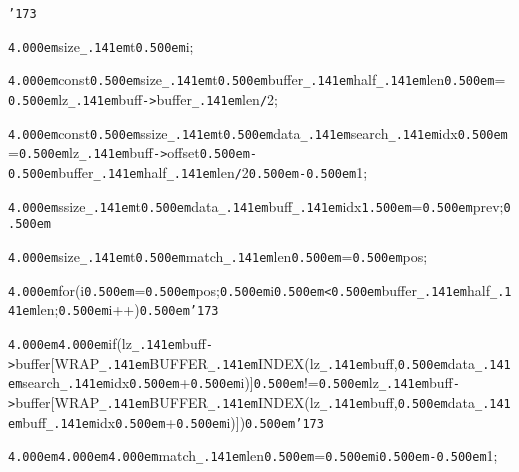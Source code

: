 \noindent
{}{\tt\char'173}

\noindent
{}{\tt\mc \kern4.000em}size{\tt\_\kern.141em}t{\tt\mc \kern0.500em}i;

\noindent
{}{\tt\mc \kern4.000em}const{\tt\mc \kern0.500em}size{\tt\_\kern.141em}t{\tt\mc \kern0.500em}buffer{\tt\_\kern.141em}half{\tt\_\kern.141em}len{\tt\mc \kern0.500em}={\tt\mc \kern0.500em}lz{\tt\_\kern.141em}buff{\tt -}{\tt >}buffer{\tt\_\kern.141em}len{\tt /}2;

\noindent
{}{\tt\mc \kern4.000em}const{\tt\mc \kern0.500em}ssize{\tt\_\kern.141em}t{\tt\mc \kern0.500em}data{\tt\_\kern.141em}search{\tt\_\kern.141em}idx{\tt\mc \kern0.500em}={\tt\mc \kern0.500em}lz{\tt\_\kern.141em}buff{\tt -}{\tt >}offset{\tt\mc \kern0.500em}{\tt -}{\tt\mc \kern0.500em}buffer{\tt\_\kern.141em}half{\tt\_\kern.141em}len{\tt /}2{\tt\mc \kern0.500em}{\tt -}{\tt\mc \kern0.500em}1;

\noindent
{}{\tt\mc \kern4.000em}ssize{\tt\_\kern.141em}t{\tt\mc \kern0.500em}data{\tt\_\kern.141em}buff{\tt\_\kern.141em}idx{\tt\mc \kern1.500em}={\tt\mc \kern0.500em}prev;{\tt\mc \kern0.500em}

\noindent
{}\hfill

\noindent
{}{\tt\mc \kern4.000em}size{\tt\_\kern.141em}t{\tt\mc \kern0.500em}match{\tt\_\kern.141em}len{\tt\mc \kern0.500em}={\tt\mc \kern0.500em}pos;

\noindent
{}\hfill

\noindent
{}{\tt\mc \kern4.000em}for(i{\tt\mc \kern0.500em}={\tt\mc \kern0.500em}pos;{\tt\mc \kern0.500em}i{\tt\mc \kern0.500em}{\tt <}{\tt\mc \kern0.500em}buffer{\tt\_\kern.141em}half{\tt\_\kern.141em}len;{\tt\mc \kern0.500em}i++){\tt\mc \kern0.500em}{\tt\char'173}

\noindent
{}{\tt\mc \kern4.000em}{\tt\mc \kern4.000em}if(lz{\tt\_\kern.141em}buff{\tt -}{\tt >}buffer[WRAP{\tt\_\kern.141em}BUFFER{\tt\_\kern.141em}INDEX(lz{\tt\_\kern.141em}buff,{\tt\mc \kern0.500em}data{\tt\_\kern.141em}search{\tt\_\kern.141em}idx{\tt\mc \kern0.500em}+{\tt\mc \kern0.500em}i)]{\tt\mc \kern0.500em}!={\tt\mc \kern0.500em}lz{\tt\_\kern.141em}buff{\tt -}{\tt >}buffer[WRAP{\tt\_\kern.141em}BUFFER{\tt\_\kern.141em}INDEX(lz{\tt\_\kern.141em}buff,{\tt\mc \kern0.500em}data{\tt\_\kern.141em}buff{\tt\_\kern.141em}idx{\tt\mc \kern0.500em}+{\tt\mc \kern0.500em}i)]){\tt\mc \kern0.500em}{\tt\char'173}

\noindent
{}{\tt\mc \kern4.000em}{\tt\mc \kern4.000em}{\tt\mc \kern4.000em}match{\tt\_\kern.141em}len{\tt\mc \kern0.500em}={\tt\mc \kern0.500em}i{\tt\mc \kern0.500em}{\tt -}{\tt\mc \kern0.500em}1;

